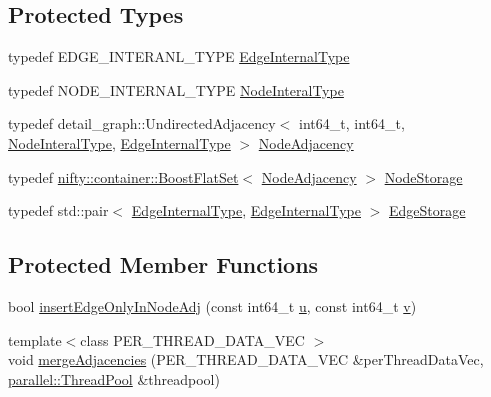 \subsection*{Protected Types}
\begin{DoxyCompactItemize}
\item 
typedef E\+D\+G\+E\+\_\+\+I\+N\+T\+E\+R\+A\+N\+L\+\_\+\+T\+Y\+PE \hyperlink{classnifty_1_1graph_1_1UndirectedGraph_a70e38582c25deca5e0ce080277cb30fc}{Edge\+Internal\+Type}
\item 
typedef N\+O\+D\+E\+\_\+\+I\+N\+T\+E\+R\+N\+A\+L\+\_\+\+T\+Y\+PE \hyperlink{classnifty_1_1graph_1_1UndirectedGraph_aa3b43dd44281416b7232caae529e8780}{Node\+Interal\+Type}
\item 
typedef detail\+\_\+graph\+::\+Undirected\+Adjacency$<$ int64\+\_\+t, int64\+\_\+t, \hyperlink{classnifty_1_1graph_1_1UndirectedGraph_aa3b43dd44281416b7232caae529e8780}{Node\+Interal\+Type}, \hyperlink{classnifty_1_1graph_1_1UndirectedGraph_a70e38582c25deca5e0ce080277cb30fc}{Edge\+Internal\+Type} $>$ \hyperlink{classnifty_1_1graph_1_1UndirectedGraph_ab50d4774bd9a93ac226589352866df69}{Node\+Adjacency}
\item 
typedef \hyperlink{namespacenifty_1_1container_ad9f6bbba60eac29f50d418e4c09d5c7b}{nifty\+::container\+::\+Boost\+Flat\+Set}$<$ \hyperlink{classnifty_1_1graph_1_1UndirectedGraph_ab50d4774bd9a93ac226589352866df69}{Node\+Adjacency} $>$ \hyperlink{classnifty_1_1graph_1_1UndirectedGraph_a6e9a6dd89601d6f9039492053dc9f2a8}{Node\+Storage}
\item 
typedef std\+::pair$<$ \hyperlink{classnifty_1_1graph_1_1UndirectedGraph_a70e38582c25deca5e0ce080277cb30fc}{Edge\+Internal\+Type}, \hyperlink{classnifty_1_1graph_1_1UndirectedGraph_a70e38582c25deca5e0ce080277cb30fc}{Edge\+Internal\+Type} $>$ \hyperlink{classnifty_1_1graph_1_1UndirectedGraph_a77256cc943f931180bf84b14d943f39a}{Edge\+Storage}
\end{DoxyCompactItemize}
\subsection*{Protected Member Functions}
\begin{DoxyCompactItemize}
\item 
bool \hyperlink{classnifty_1_1graph_1_1UndirectedGraph_a2a97f53b477b71af29c6e8409729e353}{insert\+Edge\+Only\+In\+Node\+Adj} (const int64\+\_\+t \hyperlink{classnifty_1_1graph_1_1UndirectedGraph_ad615dcee7447b5663be51ff5725943d6}{u}, const int64\+\_\+t \hyperlink{classnifty_1_1graph_1_1UndirectedGraph_af5f8ff3cf680e86d0fc2eb4a40cd7e45}{v})
\item 
{\footnotesize template$<$class P\+E\+R\+\_\+\+T\+H\+R\+E\+A\+D\+\_\+\+D\+A\+T\+A\+\_\+\+V\+EC $>$ }\\void \hyperlink{classnifty_1_1graph_1_1UndirectedGraph_a397456fa4036ba4606a375e3c78cb9d4}{merge\+Adjacencies} (P\+E\+R\+\_\+\+T\+H\+R\+E\+A\+D\+\_\+\+D\+A\+T\+A\+\_\+\+V\+EC \&per\+Thread\+Data\+Vec, \hyperlink{classnifty_1_1parallel_1_1ThreadPool}{parallel\+::\+Thread\+Pool} \&threadpool)
\end{DoxyCompactItemize}
